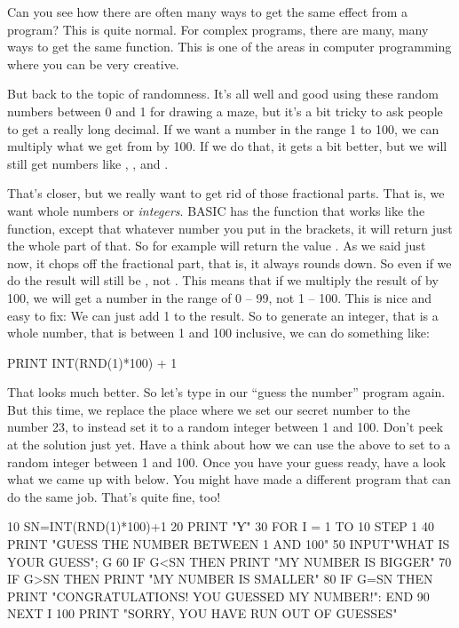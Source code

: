 Can you see how there are often many ways to get the same effect from
a program? This is quite normal. For complex programs, there are
many, many ways to get the same function.  This is one of the areas
in computer programming where you can be very creative.

But back to the topic of randomness. It's all well and good using
these random numbers between 0 and 1 for drawing a maze, but it's a
bit tricky to ask people to get a really long decimal.  If we want a
number in the range 1 to 100, we can multiply what we get from
 by 100. If we do that, it gets a bit better, but we will
still get numbers like , ,
 and .

\needspace{3cm}
That's closer, but we really want to get rid of those fractional
parts. That is, we want whole numbers or {\em integers}.  BASIC has
the  function that works like the  function,
except that whatever number you put in the brackets, it will return
just the whole part of that.  So for example  will
return the value . As we said just now, it chops off the
fractional part, that is, it always rounds down. So even if we do
 the result will still be , not .
This means that if we multiply the result of  by 100, we
will get a number in the range of 0 -- 99, not 1 -- 100. This is nice
and easy to fix: We can just add 1 to the result.  So to generate an
integer, that is a whole number, that is between 1 and 100 inclusive,
we can do something like:

\begin{screenoutput}
  PRINT INT(RND(1)*100) + 1
\end{screenoutput}

\needspace{3cm}
That looks much better. So let's type in our ``guess the number''
program again. But this time, we replace the place where we set
our secret number to the number 23, to instead set it to a random
integer between 1 and 100.  Don't peek at the solution just yet. Have a
think about how we can use the above to set  to a random
integer between 1 and 100.  Once you have your guess ready, have a
look what we came up with below. You might have made a different
program that can do the same job. That's quite fine, too!

\begin{screenoutput}
10 SN=INT(RND(1)*100)+1
20 PRINT "Ƴ"
30 FOR I = 1 TO 10 STEP 1
40 PRINT "GUESS THE NUMBER BETWEEN 1 AND 100"
50 INPUT"WHAT IS YOUR GUESS"; G
60 IF G<SN THEN PRINT "MY NUMBER IS BIGGER"
70 IF G>SN THEN PRINT "MY NUMBER IS SMALLER"
80 IF G=SN THEN PRINT "CONGRATULATIONS! YOU GUESSED MY NUMBER!": END
90 NEXT I
100 PRINT "SORRY, YOU HAVE RUN OUT OF GUESSES"
\end{screenoutput}

